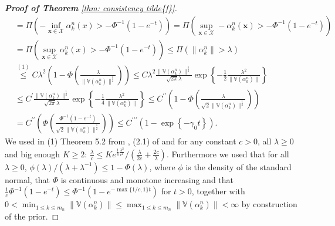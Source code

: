 \begin{proof}[\hypertarget{proof of thm consistency f tilde}{\textbf{Proof of Theorem}} \ref{thm: consistency tilde{f}}]
\begin{align*}
        & =\Pi\left(-\inf_{\boldsymbol{x} \in \mathcal{X}} \alpha_k^n(x)>-\Phi^{-1}\left(1-e^{-t}\right)\right)=\Pi\left(\sup_{\boldsymbol{x} \in \mathcal{X}}-\alpha_k^n(\boldsymbol{x})>-\Phi^{-1}\left(1-e^{-t}\right)\right) \\
        & =\Pi \left(\sup_{\boldsymbol{x} \in \mathcal{X}}\alpha_k^n(x)>-\Phi^{-1}\left(1-e^{-t}\right)\right) \leqslant \Pi\left(\left\|\alpha_k^n\right\|> \lambda\right) \\
        & \stackrel{(1)}{\leq} C \lambda^2 \left( 1 -\Phi \left( \frac{\lambda}{\| \mathbb{V}(\alpha^n_k) \|^{\frac{1}{2}}} \right) \right) \leq C \lambda^2 \frac{\| \mathbb{V}(\alpha^n_k) \|^{\frac{1}{2}}}{\sqrt{2 \pi} \lambda} \exp{\left\{- \frac{1}{2} \frac{\lambda^2}{ \|\mathbb{V}(\alpha^n_k) \|}\right\}} \\
        & \leq C^{\prime}  \frac{\| \mathbb{V}(\alpha^n_k) \|^{\frac{1}{2}}}{\sqrt{2 \pi} \lambda} \exp{\left\{- \frac{1}{4} \frac{\lambda^2}{ \|\mathbb{V}(\alpha^n_k) \|}\right\}} \leq C^{\prime \prime} \left( 1 - \Phi \left( \frac{\lambda}{\sqrt{2} \|\mathbb{V}(\alpha_k^n) \|^{\frac{1}{2}}} \right) \right) \\
        &= C^{\prime \prime} \left( \Phi \left( \frac{\Phi^{-1}\left(1-e^{-t}\right)}{\sqrt{2} \|\mathbb{V}(\alpha_k^n) \|^{\frac{1}{2}}} \right) \right) \leq C^{\prime \prime \prime} \left( 1 - \exp \left\{ - \gamma_0 t \right\} \right).
    \end{align*}
    We used in (1) Theorem 5.2 from \cite{201}, (2.1) of \cite{4} and for any constant $c>0$, all $\lambda \geq 0$ and big enough $K \geq 2$: $\frac{\lambda}{c} \leq K e^{\frac{1}{4}\frac{\lambda^2}{c^2}}/(\frac{\lambda}{2c} + \frac{2c}{\lambda})$. Furthermore we used that for all $\lambda \geq 0$, $\phi(\lambda)/(\lambda + \lambda^{-1}) \leq 1 - \Phi(\lambda)$, where $\phi$ is the density of the standard normal, that $\Phi$ is continuous and monotone increasing and that $\frac{1}{c}\Phi^{-1}(1-e^{-t}) \leq \Phi^{-1} (1 - e^{-\max \{ 1/c,1\}t})$ for $t >0$,  together with $0 < \min_{ 1 \leq k \leq m_n}\|\mathbb{V}(\alpha_k^n) \| \leq \max_{ 1 \leq k \leq m_n}\|\mathbb{V}(\alpha_k^n) \| <\infty$ by construction of the prior.
    

\end{proof}
